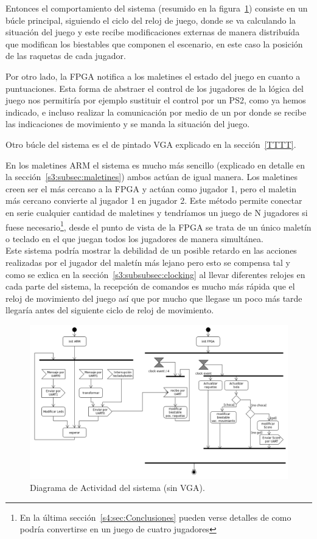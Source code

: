 Entonces el comportamiento del sistema (resumido en la
figura~\ref{s2:fig:comportamiento}) consiste en un búcle principal,
siguiendo el ciclo del reloj de juego,
donde se va calculando la situación del juego y este recibe
modificaciones externas de manera distribuída que modifican los
biestables que componen el escenario, en este caso la posición de las
raquetas de cada jugador.  

Por otro lado, la FPGA notifica a los maletines el estado del juego en
cuanto a puntuaciones. Esta forma de abstraer el control de los
jugadores de la lógica del juego nos permitiría por ejemplo sustituir
el control por un PS2, como ya hemos indicado, e incluso realizar la
comunicación por medio de un  por donde se recibe las
indicaciones de movimiento y se manda la situación del juego. 

Otro búcle del sistema es el de pintado VGA explicado en la
sección~\ref{TTTT}.

En los maletines ARM el sistema es mucho más sencillo (explicado en
detalle en la sección~\ref{s3:subsec:maletines}) ambos actúan de igual
manera. Los maletines creen ser el más cercano a la FPGA y actúan como
jugador 1, pero el maletin más cercano convierte al jugador 1 en
jugador 2. Este método permite conectar en serie cualquier cantidad de
maletines y tendríamos un juego de N jugadores si fuese
necesario\footnote{En la última sección~\ref{s4:sec:Conclusiones}
  pueden verse detalles de como podría convertirse en un juego de
  cuatro jugadores}, desde el punto de vista de la FPGA se trata de un único
maletín o teclado en el que juegan todos los jugadores de manera simultánea. \\

Este sistema podría mostrar la debilidad de un posible retardo en las
acciones realizadas por el jugador del maletín más lejano pero esto se
compensa tal y como se exlica en la sección~\ref{s3:subsubsec:clocking} al llevar
diferentes relojes en cada parte del sistema, la recepción de comandos
es mucho más rápida que el reloj de movimiento del juego así que por
mucho que llegase un poco más tarde llegaría antes del siguiente ciclo
de reloj de movimiento.

\begin{figure}[h]
  \centering
  \includegraphics[width=1.0\textwidth]{images/sistema.png}
  \caption{Diagrama de Actividad del sistema (sin VGA).}
  \label{s2:fig:comportamiento}
\end{figure}

